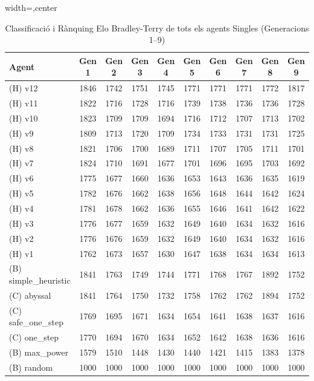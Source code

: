 \begin{table}[htbp]
\caption{Classificació i Rànquing Elo Bradley-Terry de tots els agents Singles (Generacions 1--9)}
\label{tab:elo_singles_all_gens}
\begin{adjustbox}{width=\linewidth,center}
\begin{tabular}{lccccccccc}
\hline
Agent & Gen 1 & Gen 2 & Gen 3 & Gen 4 & Gen 5 & Gen 6 & Gen 7 & Gen 8 & Gen 9 \\
\hline
(H) v12 & 1846 & 1742 & 1751 & 1745 & 1771 & 1771 & 1771 & 1772 & 1817 \\
(H) v11 & 1822 & 1716 & 1728 & 1716 & 1739 & 1738 & 1736 & 1736 & 1728 \\
(H) v10 & 1823 & 1709 & 1709 & 1694 & 1716 & 1712 & 1707 & 1713 & 1702 \\
(H) v9 & 1809 & 1713 & 1720 & 1709 & 1734 & 1733 & 1731 & 1731 & 1725 \\
(H) v8 & 1821 & 1706 & 1700 & 1689 & 1711 & 1707 & 1705 & 1711 & 1701 \\
(H) v7 & 1824 & 1710 & 1691 & 1677 & 1701 & 1696 & 1695 & 1703 & 1692 \\
(H) v6 & 1775 & 1677 & 1660 & 1636 & 1653 & 1643 & 1636 & 1635 & 1619 \\
(H) v5 & 1782 & 1676 & 1662 & 1638 & 1656 & 1648 & 1644 & 1642 & 1624 \\
(H) v4 & 1781 & 1678 & 1662 & 1636 & 1655 & 1646 & 1641 & 1642 & 1622 \\
(H) v3 & 1776 & 1677 & 1659 & 1632 & 1649 & 1640 & 1634 & 1632 & 1616 \\
(H) v2 & 1776 & 1676 & 1659 & 1632 & 1649 & 1640 & 1634 & 1632 & 1616 \\
(H) v1 & 1762 & 1673 & 1657 & 1630 & 1647 & 1638 & 1634 & 1634 & 1613 \\
(B) simple\_heuristic & 1841 & 1763 & 1749 & 1744 & 1771 & 1768 & 1767 & 1892 & 1752 \\
(C) abyssal & 1841 & 1764 & 1750 & 1732 & 1758 & 1762 & 1762 & 1894 & 1752 \\
(C) safe\_one\_step & 1769 & 1695 & 1671 & 1634 & 1654 & 1641 & 1638 & 1637 & 1616 \\
(C) one\_step & 1770 & 1694 & 1670 & 1634 & 1652 & 1642 & 1638 & 1636 & 1616 \\
(B) max\_power & 1579 & 1510 & 1448 & 1430 & 1440 & 1421 & 1415 & 1383 & 1378 \\
(B) random & 1000 & 1000 & 1000 & 1000 & 1000 & 1000 & 1000 & 1000 & 1000 \\
\hline
\end{tabular}
\end{adjustbox}
\end{table}
